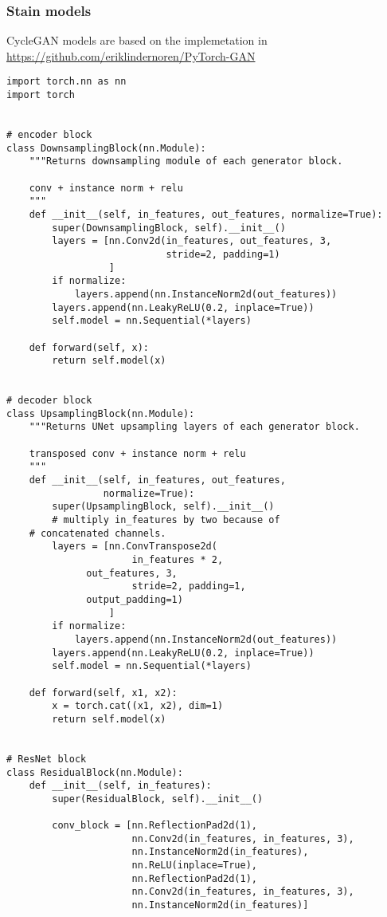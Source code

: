 \documentclass[../main.tex]{subfiles}
\begin{document}
\subsubsection*{Stain models}\label{apendix:stain}
CycleGAN models are based on the implemetation in\\
\url{https://github.com/eriklindernoren/PyTorch-GAN}

\begin{lstlisting}
import torch.nn as nn
import torch


# encoder block
class DownsamplingBlock(nn.Module):
    """Returns downsampling module of each generator block.

    conv + instance norm + relu
    """
    def __init__(self, in_features, out_features, normalize=True):
        super(DownsamplingBlock, self).__init__()
        layers = [nn.Conv2d(in_features, out_features, 3,
                            stride=2, padding=1)
                  ]
        if normalize:
            layers.append(nn.InstanceNorm2d(out_features))
        layers.append(nn.LeakyReLU(0.2, inplace=True))
        self.model = nn.Sequential(*layers)

    def forward(self, x):
        return self.model(x)


# decoder block
class UpsamplingBlock(nn.Module):
    """Returns UNet upsampling layers of each generator block.

    transposed conv + instance norm + relu
    """
    def __init__(self, in_features, out_features,
                 normalize=True):
        super(UpsamplingBlock, self).__init__()
        # multiply in_features by two because of
	# concatenated channels.
        layers = [nn.ConvTranspose2d(
                      in_features * 2,
		      out_features, 3,
                      stride=2, padding=1,
		      output_padding=1)
                  ]
        if normalize:
            layers.append(nn.InstanceNorm2d(out_features))
        layers.append(nn.LeakyReLU(0.2, inplace=True))
        self.model = nn.Sequential(*layers)

    def forward(self, x1, x2):
        x = torch.cat((x1, x2), dim=1)
        return self.model(x)


# ResNet block
class ResidualBlock(nn.Module):
    def __init__(self, in_features):
        super(ResidualBlock, self).__init__()

        conv_block = [nn.ReflectionPad2d(1),
                      nn.Conv2d(in_features, in_features, 3),
                      nn.InstanceNorm2d(in_features),
                      nn.ReLU(inplace=True),
                      nn.ReflectionPad2d(1),
                      nn.Conv2d(in_features, in_features, 3),
                      nn.InstanceNorm2d(in_features)]


\end{lstlisting}
\end{document}
